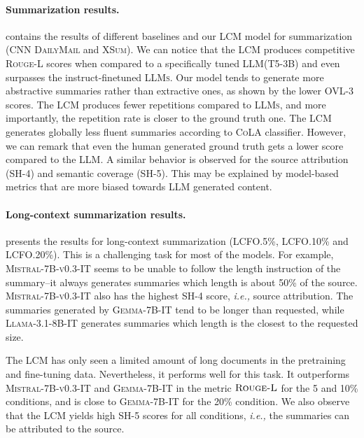 \documentclass[twoside,11pt]{fairmeta}
\newcommand{\llm}{\textsc{LLM}\xspace}
\newcommand{\llms}{\textsc{LLMs}\xspace}
\newcommand{\gemmaIT}{\textsc{Gemma-7B-IT}\xspace}
\newcommand{\mistralIT}{\textsc{Mistral-7B-v0.3-IT}\xspace}
\newcommand{\llamaIT}{\textsc{Llama-3.1-8B-IT}\xspace}
\newcommand{\lcm}{\textsc{LCM}\xspace}
\newcommand{\cnndm}{\textsc{CNN DailyMail}\xspace}
\newcommand{\xsum}{\textsc{XSum}\xspace}
\newcommand{\lcfofive}{\textsc{LCFO.5\%}\xspace}
\newcommand{\lcfoten}{\textsc{LCFO.10\%}\xspace}
\newcommand{\lcfotwenty}{\textsc{LCFO.20\%}\xspace}
\newcommand{\rougellong}{\textsc{Rouge-L}\xspace}
\newcommand{\ovlthree}{\textsc{OVL-3}\xspace}
\newcommand{\cola}{\textsc{CoLA}\xspace}
\newcommand{\shfour}{\textsc{SH-4}\xspace}
\newcommand{\shfive}{\textsc{SH-5}\xspace}
\newcommand{\ie}{\textit{i.e.,}\xspace}
\begin{document}
\paragraph{Summarization results.}
 contains the results of different baselines and our \lcm model for summarization (\cnndm and \xsum).
We can notice that the \lcm produces competitive \rougellong scores when compared to a specifically tuned \llm (T5-3B) and even surpasses the instruct-finetuned \llms. 
Our model tends to generate more abstractive summaries rather than extractive ones, as shown by the lower \ovlthree scores. 
The \lcm produces fewer repetitions compared to \llms, and more importantly, the repetition rate is closer to the ground truth one. 
The \lcm generates globally less fluent summaries according to \cola classifier. 
However, we can remark that even the human generated ground truth gets a lower score compared to the \llm. 
A similar behavior is observed for the source attribution (\shfour) and semantic coverage (\shfive). 
This may be explained by model-based metrics that are more biased towards \llm generated content.


\paragraph{Long-context summarization results.}
 presents the results for long-context summarization (\lcfofive, \lcfoten and \lcfotwenty).
This is a challenging task for most of the models.
For example, \mistralIT seems to be unable to follow the length instruction of the summary--it always generates summaries which length is about 50\% of the source. \mistralIT also has the highest \shfour score, \ie source attribution.
The summaries generated by \gemmaIT tend to be longer than requested, while \llamaIT generates summaries which length is the closest to the requested size.

The \lcm has only seen a limited amount of long documents in the pretraining and fine-tuning data. Nevertheless, it performs well for this task.
It outperforms \mistralIT and \gemmaIT in the metric $\rougellong$ for the 5 and 10\% conditions, and is close to \gemmaIT for the 20\% condition. We also observe that the \lcm yields high \shfive scores for all conditions, \ie the summaries can be attributed to the source.
\end{document}

